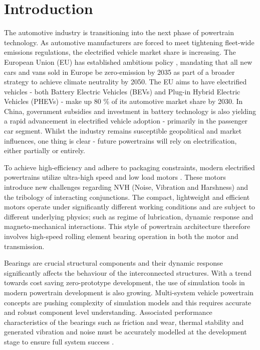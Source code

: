 \chapter{Introduction} \label{Introduction}

The automotive industry is transitioning into the next phase of powertrain technology. As automotive manufacturers are forced to meet tightening fleet-wide emissions regulations, the electrified vehicle market share is increasing. The European Union (EU) has established ambitious policy \cite{EUL110/5}, mandating that all new cars and vans sold in Europe be zero-emission by 2035 as part of a broader strategy to achieve climate neutrality by 2050. The EU aims to have electrified vehicles - both Battery Electric Vehicles (BEVs) and Plug-in Hybrid Electric Vehicles (PHEVs) - make up 80 \% of its automotive market share by 2030. In China, government subsidies and investment in battery technology is also yielding a rapid advancement in electrified vehicle adoption - primarily in the passenger car segment. Whilst the industry remains susceptible geopolitical and market influences, one thing is clear - future powertrains will rely on electrification, either partially or entirely.

To achieve high-efficiency and adhere to packaging constraints, modern electrified powertrains utilize ultra-high speed and low load motors \cite{Cai2021}. These motors introduce new challenges regarding NVH (Noise, Vibration and Harshness) and the tribology of interacting conjunctions. The compact, lightweight and efficient motors operate under significantly different working conditions and are subject to different underlying physics; such as regime of lubrication, dynamic response and magneto-mechanical interactions. This style of powertrain architecture therefore involves high-speed rolling element bearing operation in both the motor and transmission.

Bearings are crucial structural components and their dynamic response significantly affects the behaviour of the interconnected structures. With a trend towards cost saving zero-prototype development, the use of simulation tools in modern powertrain development is also growing. Multi-system vehicle powertrain concepts are pushing complexity of simulation models and this requires accurate and robust component level understanding. Associated performance characteristics of the bearings such as friction and wear, thermal stability and generated vibration and noise must be accurately modelled at the development stage to ensure full system success \cite{Wensing1972a}.


